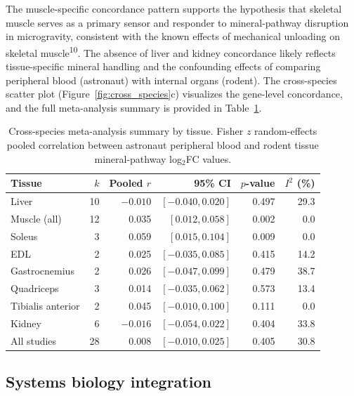 \documentclass[11pt,a4paper]{article}
\begin{document}
The muscle-specific concordance pattern supports the hypothesis that skeletal muscle serves as a primary sensor and responder to mineral-pathway disruption in microgravity, consistent with the known effects of mechanical unloading on skeletal muscle\textsuperscript{10}. The absence of liver and kidney concordance likely reflects tissue-specific mineral handling and the confounding effects of comparing peripheral blood (astronaut) with internal organs (rodent). The cross-species scatter plot (Figure~\ref{fig:cross_species}c) visualizes the gene-level concordance, and the full meta-analysis summary is provided in Table~\ref{tab:meta_summary}.

\begin{table}[H]
\centering
\caption{Cross-species meta-analysis summary by tissue. Fisher $z$ random-effects pooled correlation between astronaut peripheral blood and rodent tissue mineral-pathway log$_2$FC values.}
\label{tab:meta_summary}
\begin{tabular}{lrrrrr}
\toprule
\textbf{Tissue} & \textbf{$k$} & \textbf{Pooled $r$} & \textbf{95\% CI} & \textbf{$p$-value} & \textbf{$I^2$ (\%)} \\
\midrule
Liver & 10 & $-0.010$ & $[-0.040, 0.020]$ & 0.497 & 29.3 \\
Muscle (all) & 12 & 0.035 & $[0.012, 0.058]$ & 0.002 & 0.0 \\
\quad Soleus & 3 & 0.059 & $[0.015, 0.104]$ & 0.009 & 0.0 \\
\quad EDL & 2 & 0.025 & $[-0.035, 0.085]$ & 0.415 & 14.2 \\
\quad Gastrocnemius & 2 & 0.026 & $[-0.047, 0.099]$ & 0.479 & 38.7 \\
\quad Quadriceps & 3 & 0.014 & $[-0.035, 0.062]$ & 0.573 & 13.4 \\
\quad Tibialis anterior & 2 & 0.045 & $[-0.010, 0.100]$ & 0.111 & 0.0 \\
Kidney & 6 & $-0.016$ & $[-0.054, 0.022]$ & 0.404 & 33.8 \\
All studies & 28 & 0.008 & $[-0.010, 0.025]$ & 0.405 & 30.8 \\
\bottomrule
\end{tabular}
\end{table}

\subsection{Systems biology integration}
\end{document}
